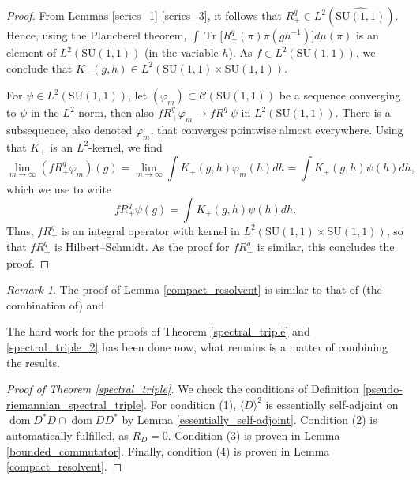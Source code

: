 \documentclass{amsart}
\theoremstyle{definition}
\theoremstyle{remark}
\newtheorem{remark}[theorem]{Remark}
\DeclareMathOperator{\Tr}{Tr}
\numberwithin{equation}{section}
\begin{document}
\begin{proof}
    From Lemmas \ref{series_1}-\ref{series_3}, it follows that $R_+^q\in L^2(\widehat{\mathrm{SU}(1,1)})$. Hence, using the Plancherel theorem, $\int\Tr\big[R_+^q(\pi)\pi(gh^{-1})\big]d\mu(\pi)$ is an element of $L^2(\mathrm{SU}(1,1))$ (in the variable $h$). As $f\in L^2(\mathrm{SU}(1,1))$, we conclude that $K_+(g,h)\in L^2(\mathrm{SU}(1,1)\times \mathrm{SU}(1,1))$.
    
    For $\psi\in L^2(\mathrm{SU}(1,1))$, let $(\varphi_m)\subset\mathcal{C}(\mathrm{SU}(1,1))$ be a sequence converging to $\psi$ in the $L^2$-norm, then also $fR_+^q \varphi_m\rightarrow fR_+^q\psi$ in $L^2(\mathrm{SU}(1,1))$. There is a subsequence, also denoted $\varphi_m$, that converges pointwise almost everywhere. Using that $K_+$ is an $L^2$-kernel, we find
    \begin{equation*}
        \lim_{m\rightarrow\infty}(fR_+^q\varphi_m)(g)=\lim_{m\rightarrow\infty}\int K_+(g,h)\varphi_m(h)dh=\int K_+(g,h)\psi(h)dh,
    \end{equation*}
    which we use to write
    \begin{equation*}
        fR_+^q\psi(g)=\int K_+(g,h)\psi(h)dh.
    \end{equation*}
    Thus, $fR_+^q$ is an integral operator with kernel in $L^2(\mathrm{SU}(1,1)\times \mathrm{SU}(1,1))$, so that $fR_+^q$ is Hilbert--Schmidt. As the proof for $fR_-^q$ is similar, this concludes the proof.
\end{proof}

\begin{remark}\label{rmk_proof_abelian}
    The proof of Lemma \ref{compact_resolvent} is similar to that of (the combination of)  \cite[Theorem IX.29]{reed_simon_vol2} and \cite[Theorem XI.20]{reed_simon_vol3} 
\end{remark}

The hard work for the proofs of Theorem \ref{spectral_triple} and \ref{spectral_triple_2} has been done now, what remains is a matter of combining the results.

\begin{proof}[Proof of Theorem \ref{spectral_triple}]
    We check the conditions of Definition \ref{pseudo-riemannian_spectral_triple}. For condition (1), $\langle D\rangle^2$ is essentially self-adjoint on $\operatorname{dom} D^*D\cap\operatorname{dom}DD^*$ by Lemma \ref{essentially_self-adjoint}. Condition (2) is automatically fulfilled, as $R_D=0$. Condition (3) is proven in Lemma \ref{bounded_commutator}. Finally, condition (4) is proven in Lemma \ref{compact_resolvent}.
\end{proof}
\end{document}
